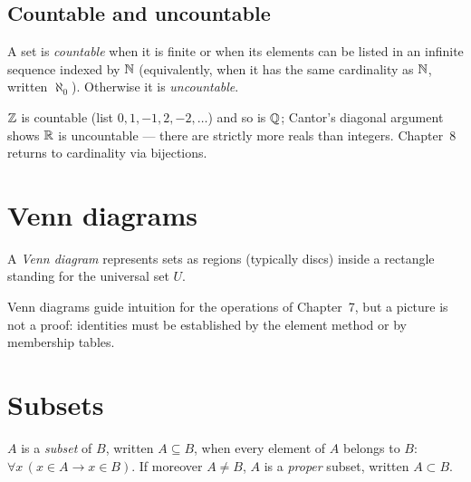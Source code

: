 \subsection{Countable and uncountable}

\begin{definition}
A set is \emph{countable} when it is finite or when its elements can be listed
in an infinite sequence indexed by $\mathbb{N}$ (equivalently, when it has the same
cardinality as $\mathbb{N}$, written $\aleph_0$). Otherwise it is \emph{uncountable}.
\end{definition}

$\mathbb{Z}$ is countable (list $0, 1, -1, 2, -2, \ldots$) and so is $\mathbb{Q}$; Cantor's
diagonal argument shows $\mathbb{R}$ is uncountable --- there are strictly more reals
than integers. Chapter~8 returns to cardinality via bijections.

\section{Venn diagrams}

A \emph{Venn diagram} represents sets as regions (typically discs) inside a
rectangle standing for the universal set $U$.

\begin{center}
\end{center}

Venn diagrams guide intuition for the operations of Chapter~7, but a picture
is not a proof: identities must be established by the element method or by
membership tables.

\section{Subsets}

\begin{definition}
$A$ is a \emph{subset} of $B$, written $A \subseteq B$, when every element of
$A$ belongs to $B$: $\forall x\,(x \in A \to x \in B)$. If moreover
$A \neq B$, $A$ is a \emph{proper} subset, written $A \subset B$.
\end{definition}

